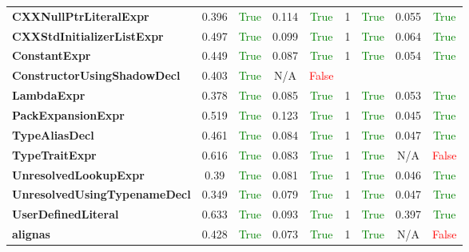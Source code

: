 \documentclass{article}
\begin{document}
\begin{xltabular}{\textwidth}{lcccccccc}
\textbf{{\fontsize{10}{12}\selectfont CXXNullPtrLiteralExpr}}& 0.396&\textcolor{green}{True}& 0.114&\textcolor{green}{True}& 1&\textcolor{green}{True}& 0.055&\textcolor{green}{True} \\[0.5ex]
\textbf{{\fontsize{10}{12}\selectfont CXXStdInitializerListExpr}}& 0.497&\textcolor{green}{True}& 0.099&\textcolor{green}{True}& 1&\textcolor{green}{True}& 0.064&\textcolor{green}{True} \\[0.5ex]
\textbf{{\fontsize{10}{12}\selectfont ConstantExpr}}& 0.449&\textcolor{green}{True}& 0.087&\textcolor{green}{True}& 1&\textcolor{green}{True}& 0.054&\textcolor{green}{True} \\[0.5ex]
\textbf{{\fontsize{10}{12}\selectfont ConstructorUsingShadowDecl}}& 0.403&\textcolor{green}{True}& N/A&\textcolor{red}{False} \\[0.5ex]
\textbf{{\fontsize{10}{12}\selectfont LambdaExpr}}& 0.378&\textcolor{green}{True}& 0.085&\textcolor{green}{True}& 1&\textcolor{green}{True}& 0.053&\textcolor{green}{True} \\[0.5ex]
\textbf{{\fontsize{10}{12}\selectfont PackExpansionExpr}}& 0.519&\textcolor{green}{True}& 0.123&\textcolor{green}{True}& 1&\textcolor{green}{True}& 0.045&\textcolor{green}{True} \\[0.5ex]
\textbf{{\fontsize{10}{12}\selectfont TypeAliasDecl}}& 0.461&\textcolor{green}{True}& 0.084&\textcolor{green}{True}& 1&\textcolor{green}{True}& 0.047&\textcolor{green}{True} \\[0.5ex]
\textbf{{\fontsize{10}{12}\selectfont TypeTraitExpr}}& 0.616&\textcolor{green}{True}& 0.083&\textcolor{green}{True}& 1&\textcolor{green}{True}& N/A&\textcolor{red}{False} \\[0.5ex]
\textbf{{\fontsize{10}{12}\selectfont UnresolvedLookupExpr}}& 0.39&\textcolor{green}{True}& 0.081&\textcolor{green}{True}& 1&\textcolor{green}{True}& 0.046&\textcolor{green}{True} \\[0.5ex]
\textbf{{\fontsize{10}{12}\selectfont UnresolvedUsingTypenameDecl}}& 0.349&\textcolor{green}{True}& 0.079&\textcolor{green}{True}& 1&\textcolor{green}{True}& 0.047&\textcolor{green}{True} \\[0.5ex]
\textbf{{\fontsize{10}{12}\selectfont UserDefinedLiteral}}& 0.633&\textcolor{green}{True}& 0.093&\textcolor{green}{True}& 1&\textcolor{green}{True}& 0.397&\textcolor{green}{True} \\[0.5ex]
\textbf{{\fontsize{10}{12}\selectfont alignas}}& 0.428&\textcolor{green}{True}& 0.073&\textcolor{green}{True}& 1&\textcolor{green}{True}& N/A&\textcolor{red}{False} \\[0.5ex]

\end{xltabular}
\end{document}
